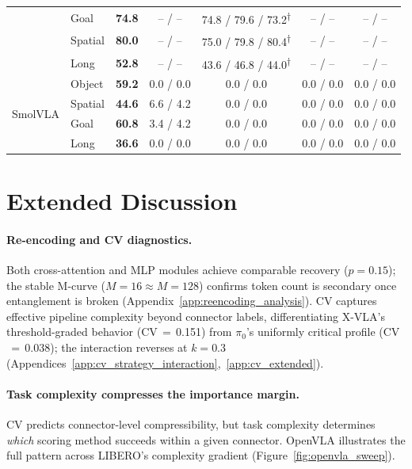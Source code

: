 \begin{table}[ht]
\begin{tabular}{llccccc}
& Goal    & \textbf{74.8} & -- / -- & 74.8 / 79.6 / 73.2\textsuperscript{$\dagger$} & -- / -- & -- / -- \\
& Spatial & \textbf{80.0} & -- / -- & 75.0 / 79.8 / 80.4\textsuperscript{$\dagger$} & -- / -- & -- / -- \\
& Long    & \textbf{52.8} & -- / -- & 43.6 / 46.8 / 44.0\textsuperscript{$\dagger$} & -- / -- & -- / -- \\
\midrule
\multirow{4}{*}{SmolVLA}
& Object  & \textbf{59.2} & 0.0 / 0.0 & 0.0 / 0.0 & 0.0 / 0.0 & 0.0 / 0.0 \\
& Spatial & \textbf{44.6} & 6.6 / 4.2 & 0.0 / 0.0 & 0.0 / 0.0 & 0.0 / 0.0 \\
& Goal    & \textbf{60.8} & 3.4 / 4.2 & 0.0 / 0.0 & 0.0 / 0.0 & 0.0 / 0.0 \\
& Long    & \textbf{36.6} & 0.0 / 0.0 & 0.0 / 0.0 & 0.0 / 0.0 & 0.0 / 0.0 \\
\bottomrule
\end{tabular}
\end{table}


\section{Extended Discussion}
\label{app:extended_discussion}
\label{app:discussion}

\paragraph{Re-encoding and CV diagnostics.}
Both cross-attention and MLP modules achieve comparable recovery ($p = 0.15$); the stable M-curve ($M{=}16 \approx M{=}128$) confirms token count is secondary once entanglement is broken (Appendix~\ref{app:reencoding_analysis}). CV captures effective pipeline complexity beyond connector labels, differentiating X-VLA's threshold-graded behavior (CV$\,{=}\,$0.151) from $\pi_0$'s uniformly critical profile (CV$\,{=}\,$0.038); the interaction reverses at $k{=}0.3$ (Appendices~\ref{app:cv_strategy_interaction},~\ref{app:cv_extended}).

\paragraph{Task complexity compresses the importance margin.}
CV predicts connector-level compressibility, but task complexity determines \emph{which} scoring method succeeds within a given connector. OpenVLA illustrates the full pattern across LIBERO's complexity gradient (Figure~\ref{fig:openvla_sweep}).

